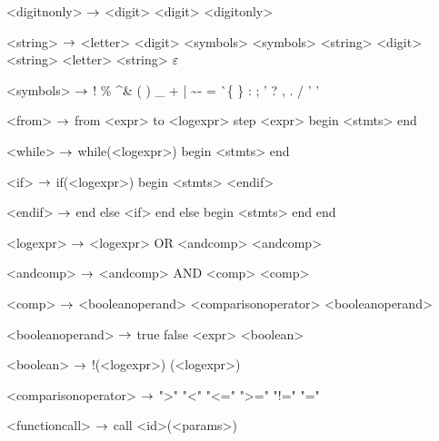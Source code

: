 \begin{grammar}
<digitnonly> $\rightarrow$ <digit>
	\alt <digit> <digitonly>

<string> $\rightarrow$ <letter>
\alt <digit>
\alt <symbols>
\alt <symbols> <string>
\alt <digit> <string>
\alt <letter> <string>
\alt $\varepsilon$

<symbols> $\rightarrow$ !
\alt \%
\alt \^
\alt \&
\alt *
\alt (
\alt )
\alt \_
\alt +
\alt |
\alt \~
\alt -
\alt =
\alt \`
\alt \{
\alt \}
\alt [
\alt ]
\alt :
\alt ;
\alt '
\alt ?
\alt ,
\alt .
\alt /
\alt ' '

<from> $\rightarrow$ from <expr> to <logexpr> step <expr>
	begin
		<stmts>
	end 

<while> $\rightarrow$ while(<logexpr>)
		begin
			<stmts>
		end

<if> $\rightarrow$ if(<logexpr>)
	begin
		<stmts>
	<endif>

<endif> $\rightarrow$ end
	else <if>
	\alt end
	else
	begin
		<stmts>
	end
	\alt end

<logexpr> $\rightarrow$ <logexpr> OR <andcomp>
		\alt <andcomp>

<andcomp> $\rightarrow$ <andcomp> AND <comp>

<comp> $\rightarrow$ <booleanoperand> <comparisonoperator> <booleanoperand>

<booleanoperand> $\rightarrow$ true
		\alt false
		\alt <boolean>

<boolean> $\rightarrow$ !(<logexpr>)
		\alt (<logexpr>)

<comparisonoperator> $\rightarrow$ ">"
				\alt "<"
				\alt "<="
				\alt ">="
				\alt "!="
				\alt "="

<functioncall> $\rightarrow$ call <id>(<params>)

\end{grammar}
